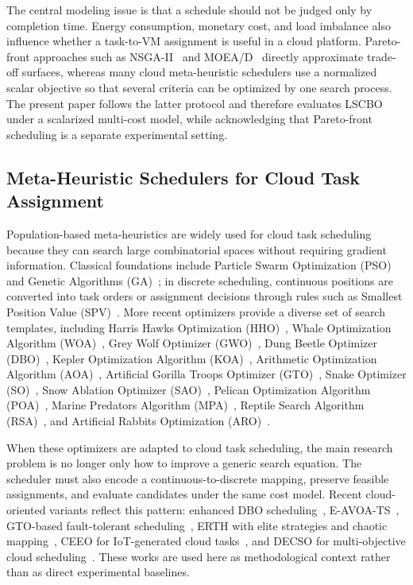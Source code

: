 \documentclass[pdflatex,onecolumn,sn-mathphys-num]{sn-jnl}
\begin{document}
The central modeling issue is that a schedule should not be judged only by completion time. Energy consumption, monetary cost, and load imbalance also influence whether a task-to-VM assignment is useful in a cloud platform. Pareto-front approaches such as NSGA-II~\cite{Deb2002} and MOEA/D~\cite{Zhang2007} directly approximate trade-off surfaces, whereas many cloud meta-heuristic schedulers use a normalized scalar objective so that several criteria can be optimized by one search process. The present paper follows the latter protocol and therefore evaluates LSCBO under a scalarized multi-cost model, while acknowledging that Pareto-front scheduling is a separate experimental setting.

\subsection{Meta-Heuristic Schedulers for Cloud Task Assignment}
Population-based meta-heuristics are widely used for cloud task scheduling because they can search large combinatorial spaces without requiring gradient information. Classical foundations include Particle Swarm Optimization (PSO)~\cite{Kennedy1995} and Genetic Algorithms (GA)~\cite{Goldberg1989}; in discrete scheduling, continuous positions are converted into task orders or assignment decisions through rules such as Smallest Position Value (SPV)~\cite{Tasgetiren2007}. More recent optimizers provide a diverse set of search templates, including Harris Hawks Optimization (HHO)~\cite{Heidari2019}, Whale Optimization Algorithm (WOA)~\cite{Mirjalili2016}, Grey Wolf Optimizer (GWO)~\cite{Mirjalili2014}, Dung Beetle Optimizer (DBO)~\cite{Xue2022}, Kepler Optimization Algorithm (KOA)~\cite{AbdelBasset2023,Qian2025}, Arithmetic Optimization Algorithm (AOA)~\cite{Abualigah2021}, Artificial Gorilla Troops Optimizer (GTO)~\cite{Abdollahzadeh2021}, Snake Optimizer (SO)~\cite{Hashim2022}, Snow Ablation Optimizer (SAO)~\cite{Deng2023}, Pelican Optimization Algorithm (POA)~\cite{Trojovska2022}, Marine Predators Algorithm (MPA)~\cite{Faramarzi2020}, Reptile Search Algorithm (RSA)~\cite{Abualigah2022}, and Artificial Rabbits Optimization (ARO)~\cite{Wang2022}.

When these optimizers are adapted to cloud task scheduling, the main research problem is no longer only how to improve a generic search equation. The scheduler must also encode a continuous-to-discrete mapping, preserve feasible assignments, and evaluate candidates under the same cost model. Recent cloud-oriented variants reflect this pattern: enhanced DBO scheduling~\cite{Xie2024}, E-AVOA-TS~\cite{Ghafari2023}, GTO-based fault-tolerant scheduling~\cite{Rengaraj2023}, ERTH with elite strategies and chaotic mapping~\cite{Ferahtia2023,Qin2024}, CEEO for IoT-generated cloud tasks~\cite{EbrahimiMood2025}, and DECSO for multi-objective cloud scheduling~\cite{Gunduz2025}. These works are used here as methodological context rather than as direct experimental baselines.
\end{document}
